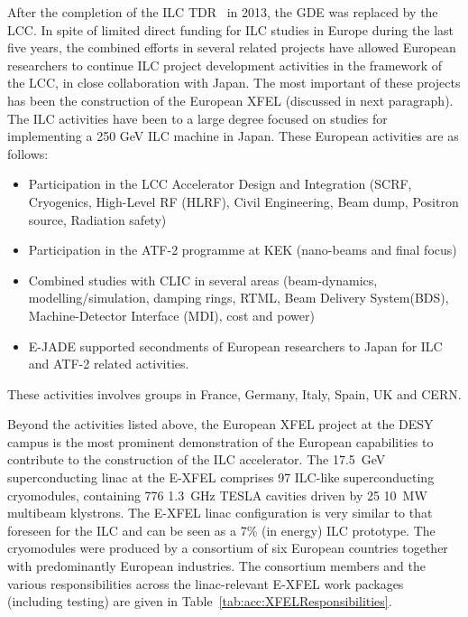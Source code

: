 \documentclass[%
 reprint,
 floatfix,
 amsmath,amssymb,
 aps,
]{revtex4-1}
\begin{document}
After the completion of the ILC TDR~\cite{Adolphsen:2013kya} in 2013, the GDE was replaced by the LCC. In spite of limited direct funding for ILC studies in Europe during the last five years, the combined efforts in several related projects have allowed European researchers to continue ILC project development activities in the framework of the LCC, in close collaboration with Japan. The most important of these projects has been the construction of the European XFEL (discussed in next paragraph). The ILC activities have been to a large degree focused on studies for implementing a 250 GeV ILC machine in Japan. These European activities are as follows:

\begin{itemize}
\item Participation in the LCC Accelerator Design and Integration (SCRF, Cryogenics, High-Level RF (HLRF), Civil Engineering, Beam dump, Positron source, Radiation safety)
\item Participation in the ATF-2 programme at KEK (nano-beams and final focus)
\item Combined studies with CLIC in several areas (beam-dynamics, modelling/simulation, damping rings, RTML, Beam Delivery System(BDS), Machine-Detector Interface (MDI), cost and power)
\item E-JADE supported secondments of European researchers to Japan for ILC and ATF-2 related activities.
\end{itemize}
These activities involves groups in  France, Germany, Italy, Spain, UK and CERN. 



Beyond the activities listed above, the European XFEL project at the DESY campus is the most prominent demonstration of the European capabilities
to contribute to the construction of the ILC accelerator.
The 17.5~GeV superconducting linac at the E-XFEL comprises 97 ILC-like superconducting cryomodules, containing 776 1.3~GHz TESLA cavities
driven by 25 10~MW multibeam klystrons. The E-XFEL linac configuration is very similar to that foreseen for the ILC and can be seen as a 7\% (in energy) ILC prototype. The cryomodules were produced by a consortium of six European countries together with predominantly European industries. 
 The consortium members and the various responsibilities across the linac-relevant E-XFEL work packages (including testing) are given in Table~\ref{tab:acc:XFELResponsibilities}.
\end{document}
